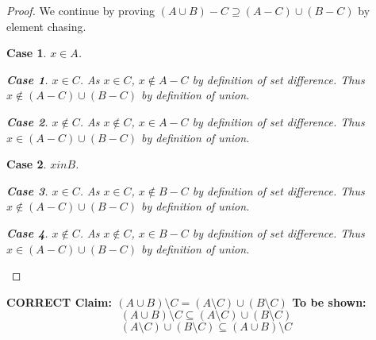\documentclass[12pt]{article}
\newtheorem{case}{Case}
\newtheorem{subcase}{Case}
\numberwithin{subcase}{case}
\begin{document}
\begin{proof}
We continue by proving $(A\cup B) - C \supseteq (A - C) \cup (B - C)$ by element chasing.
\begin{case}
$x \in A$. 
\begin{subcase}
  $x \in C$. As $x \in C$, $x \not\in A - C$ by definition of set difference. Thus $x \not\in (A - C) \cup (B
  - C)$ by definition of union.
\end{subcase}
\begin{subcase}
  $x \not\in C$. As $x \not\in C$, $x \in A - C$ by definition of set difference. Thus $x \in (A - C) \cup (B
  - C)$ by definition of union.
\end{subcase}
\end{case}
\begin{case}
  $x in B$.
  \begin{subcase}
    $x \in C$. As $x \in C$, $x \not \in B - C$ by definition of set difference. Thus $x \not\in (A - C) \cup (B
    - C)$ by definition of union.
  \end{subcase}
  \begin{subcase}
    $x \not \in C$. As $x \not \in C$, $x \in B - C$ by definition of set difference. Thus $x \in (A - C) \cup
    (B - C)$ by definition of union.
  \end{subcase}
\end{case}
\end{proof}
\pagebreak{}
\bf{CORRECT}
Claim: $(A \cup B) \setminus C = (A \setminus C)\cup (B \setminus C)$
To be shown: $$(A \cup B) \setminus C \subseteq (A \setminus C)\cup (B \setminus C)$$
$$(A \setminus C)\cup (B \setminus C) \subseteq (A \cup B) \setminus C$$
\end{document}
